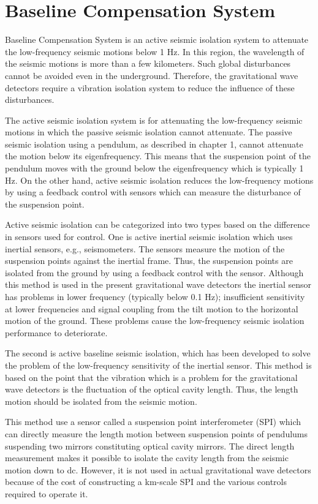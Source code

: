 \chapter{Baseline Compensation System} \label{chap4}
Baseline Compensation System is an active seismic isolation system to attenuate the low-frequency seismic motions below 1 Hz. In this region, the wavelength of the seismic motions is more than a few kilometers. Such global disturbances cannot be avoided even in the underground. Therefore, the gravitational wave detectors require a vibration isolation system to reduce the influence of these disturbances.

The active seismic isolation system is for attenuating the low-frequency seismic motions in which the passive seismic isolation cannot attenuate. The passive seismic isolation using a pendulum, as described in chapter 1, cannot attenuate the motion below its eigenfrequency. This means that the suspension point of the pendulum moves with the ground below the eigenfrequency which is typically 1 Hz. On the other hand, active seismic isolation reduces the low-frequency motions by using a feedback control with sensors which can measure the disturbance of the suspension point. 

Active seismic isolation can be categorized into two types based on the difference in sensors used for control. One is active inertial seismic isolation which uses inertial sensors, e.g., seismometers. The sensors measure the motion of the suspension points against the inertial frame. Thus, the suspension points are isolated from the ground by using a feedback control with the sensor. Although this method is used in the present gravitational wave detectors the inertial sensor has problems in lower frequency (typically below 0.1 Hz); insufficient sensitivity at lower frequencies and signal coupling from the tilt motion to the horizontal motion of the ground. These problems cause the low-frequency seismic isolation performance to deteriorate.

The second is active baseline seismic isolation, which has been developed to solve the problem of the low-frequency sensitivity of the inertial sensor. This method is based on the point that the vibration which is a problem for the gravitational wave detectors is the fluctuation of the optical cavity length. Thus, the length motion should be isolated from the seismic motion. 

This method use a sensor called a suspension point interferometer (SPI) which can directly measure the length motion between suspension points of pendulums suspending two mirrors constituting optical cavity mirrors. The direct length measurement makes it possible to isolate the cavity length from the seismic motion down to dc. However, it is not used in actual gravitational wave detectors because of the cost of constructing a km-scale SPI and the various controls required to operate it.


